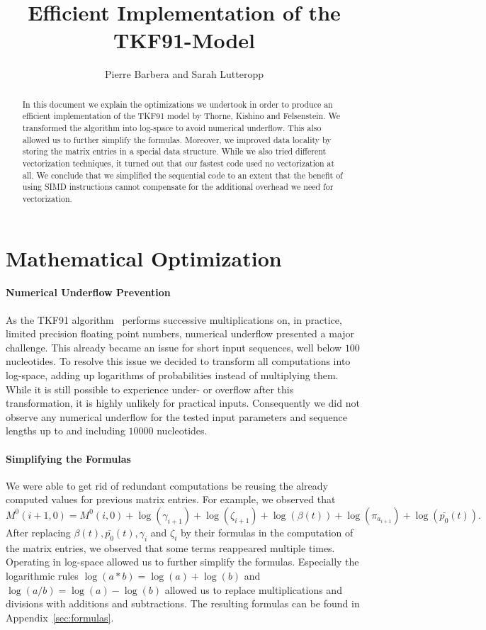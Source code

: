 \documentclass{article}
\title{Efficient Implementation of the TKF91-Model}
\author{Pierre Barbera and Sarah Lutteropp}
\begin{document}
\maketitle

\begin{abstract}
In this document we explain the optimizations we undertook in order to produce an efficient implementation of the TKF91 model by Thorne, Kishino and Felsenstein. We transformed the algorithm into log-space to avoid numerical underflow. This also allowed us to further simplify the formulas. Moreover, we improved data locality by storing the matrix entries in a special data structure. While we also tried different vectorization techniques, it turned out that our fastest code used no vectorization at all. We conclude that we simplified the sequential code to an extent that the benefit of using SIMD instructions cannot compensate for the additional overhead we need for vectorization.
\end{abstract}

\section{Mathematical Optimization}

\paragraph{Numerical Underflow Prevention}
\label{sec:log}

As the TKF91 algorithm~\cite{Thorne91tkf} performs successive multiplications on, in practice,
limited precision floating point numbers, numerical underflow presented a major
challenge. This already became an issue for short input sequences, well below $100$ nucleotides.
To resolve this issue we decided to transform all computations into log-space, adding up logarithms of probabilities instead of multiplying them.
While it is still possible to experience under- or overflow after this transformation, it is highly unlikely for practical inputs.
Consequently we did not observe any numerical underflow for the tested input parameters and sequence lengths up to and including $10000$ nucleotides.

\paragraph{Simplifying the Formulas}  
We were able to get rid of redundant computations be reusing the already computed values for previous matrix entries.
For example, we observed that $$M^0(i+1,0) = M^0(i,0) + \log(\gamma_{i+1}) + \log(\zeta_{i+1}) + \log(\beta(t)) + \log(\pi_{a_{i+1}}) + \log(\bar{p_0}(t)).$$
After replacing $\beta(t), \bar{p_0}(t), \gamma_i$ and $\zeta_i$ by their formulas in the computation of the matrix entries, we observed that some terms reappeared multiple times. 
Operating in log-space allowed us to further simplify the formulas. Especially the logarithmic rules $\log(a*b) = \log(a) + \log(b)$ and $\log(a/b) = \log(a) - \log(b)$ allowed us to replace multiplications and divisions with additions and subtractions.
The resulting formulas can be found in Appendix~\ref{sec:formulas}.
\end{document}
